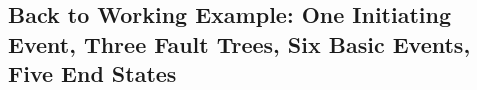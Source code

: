 \subsection{Back to Working Example: One Initiating Event, Three Fault Trees, Six Basic Events, Five End States}
\begin{frame}
  \begin{columns}
  \end{columns}
\end{frame}
